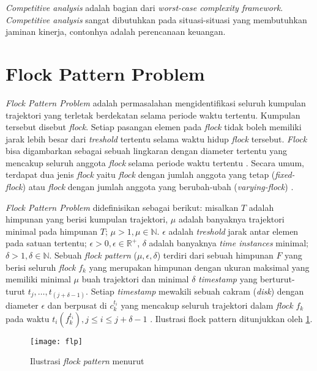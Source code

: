  \textit{Competitive analysis} adalah bagian dari \textit{worst-case complexity framework}. \textit{Competitive analysis} sangat dibutuhkan pada situasi-situasi yang membutuhkan jaminan kinerja, contonhya adalah perencanaan keuangan. \cite{algo_online_1_8_mar_2021:98}

\section{Flock Pattern Problem}
\label{sec:flp}
\textit{Flock Pattern Problem} adalah permasalahan mengidentifikasi seluruh kumpulan trajektori yang terletak berdekatan selama periode waktu tertentu. Kumpulan tersebut disebut \textit{flock}. Setiap pasangan elemen pada \textit{flock} tidak boleh memiliki jarak lebih besar dari \textit{treshold} tertentu selama waktu hidup \textit{flock} tersebut. \textit{Flock} bisa digambarkan sebagai sebuah lingkaran dengan diameter tertentu yang mencakup seluruh anggota \textit{flock} selama periode waktu tertentu \cite{flock_pattern_1:16}. Secara umum, terdapat dua jenis \textit{flock} yaitu \textit{flock} dengan jumlah anggota yang tetap (\textit{fixed-flock}) atau \textit{flock} dengan jumlah anggota yang berubah-ubah (\textit{varying-flock}) \cite{flock_pattern_2:06}.

\par \textit{Flock Pattern Problem} didefinisikan sebagai berikut: misalkan $T$ adalah himpunan yang berisi kumpulan trajektori, $\mu$ adalah banyaknya trajektori minimal pada himpunan $T$; $\mu > 1, \mu \in \mathbb{N}$. $\epsilon$ adalah \textit{treshold} jarak antar elemen pada satuan tertentu; $\epsilon > 0, \epsilon \in \mathbb{R}^{+}$, $\delta$ adalah banyaknya \textit{time instances} minimal; $\delta >1, \delta \in \mathbb{N}$. Sebuah \textit{flock pattern} ($\mu,\epsilon,\delta$) terdiri dari sebuah himpunan $F$ yang berisi seluruh \textit{flock} $f_{k}$ yang merupakan himpunan dengan ukuran maksimal yang memiliki minimal $\mu$ buah trajektori dan minimal $\delta$ \textit{timestamp} yang berturut-turut $t_j,…,t_(j+\delta-1 )$. Setiap \textit{timestamp} mewakili sebuah cakram (\textit{disk}) dengan diameter $\epsilon$ dan berpusat di $c_k^{t_i}$ yang mencakup seluruh trajektori dalam \textit{flock} $f_{k}$ pada waktu $t_{i} (f_k^{t_i}), j \leq i \leq j+ \delta-1$  \cite{flock_pattern_1:16}. Ilustrasi flock pattern ditunjukkan oleh \ref{fig:flp}.

\begin{figure}[H]
	\centering  
	\texttt{[image: flp]}  
	\caption{Ilustrasi \textit{flock pattern} menurut \cite{flock_pattern_1:16}} 
	\label{fig:flp} 
\end{figure}

